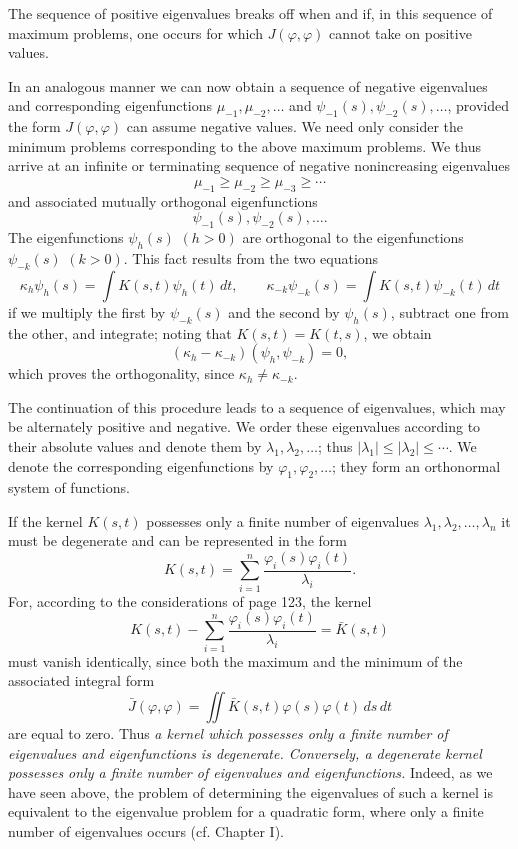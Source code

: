 The sequence of positive eigenvalues breaks off when and if, in this sequence of maximum problems, one occurs for which $J(\varphi,\varphi)$ cannot take on positive values.

In an analogous manner we can now obtain a sequence of negative eigenvalues and corresponding eigenfunctions $\mu_{-1},\mu_{-2},\ldots$ and $\psi_{-1}(s),\psi_{-2}(s),\ldots$, provided the form $J(\varphi,\varphi)$ can assume negative values. We need only consider the minimum problems corresponding to the above maximum problems. We thus arrive at an infinite or terminating sequence of negative nonincreasing eigenvalues
\begin{equation}\tag{44}
\mu_{-1}\ge\mu_{-2}\ge\mu_{-3}\ge\cdots
\end{equation}
and associated mutually orthogonal eigenfunctions
\[
\psi_{-1}(s),\psi_{-2}(s),\ldots.
\]
The eigenfunctions $\psi_h(s)$ $(h>0)$ are orthogonal to the eigenfunctions $\psi_{-k}(s)$ $(k>0)$. This fact results from the two equations
\[
\kappa_h\psi_h(s)=\int K(s,t)\psi_h(t)\,dt,
\qquad
\kappa_{-k}\psi_{-k}(s)=\int K(s,t)\psi_{-k}(t)\,dt
\]
if we multiply the first by $\psi_{-k}(s)$ and the second by $\psi_h(s)$, subtract one from the other, and integrate; noting that $K(s,t)=K(t,s)$, we obtain
\[
(\kappa_h-\kappa_{-k})(\psi_h,\psi_{-k})=0,
\]
which proves the orthogonality, since $\kappa_h\ne\kappa_{-k}$.

The continuation of this procedure leads to a sequence of eigenvalues, which may be alternately positive and negative. We order these eigenvalues according to their absolute values and denote them by $\lambda_1,\lambda_2,\ldots$; thus $|\lambda_1|\le|\lambda_2|\le\cdots$. We denote the corresponding eigenfunctions by $\varphi_1,\varphi_2,\ldots$; they form an orthonormal system of functions.

If the kernel $K(s,t)$ possesses only a finite number of eigenvalues $\lambda_1,\lambda_2,\ldots,\lambda_n$ it must be degenerate and can be represented in the form
\begin{equation}\tag{45}
K(s,t)=\sum_{i=1}^{n}\frac{\varphi_i(s)\varphi_i(t)}{\lambda_i}.
\end{equation}
For, according to the considerations of page 123, the kernel
\[
K(s,t)-\sum_{i=1}^{n}\frac{\varphi_i(s)\varphi_i(t)}{\lambda_i}
=\bar K(s,t)
\]
must vanish identically, since both the maximum and the minimum of the associated integral form
\[
\bar J(\varphi,\varphi)=\iint \bar K(s,t)\varphi(s)\varphi(t)\,ds\,dt
\]
are equal to zero. Thus \emph{a kernel which possesses only a finite number of eigenvalues and eigenfunctions is degenerate. Conversely, a degenerate kernel possesses only a finite number of eigenvalues and eigenfunctions.} Indeed, as we have seen above, the problem of determining the eigenvalues of such a kernel is equivalent to the eigenvalue problem for a quadratic form, where only a finite number of eigenvalues occurs (cf. Chapter I).

